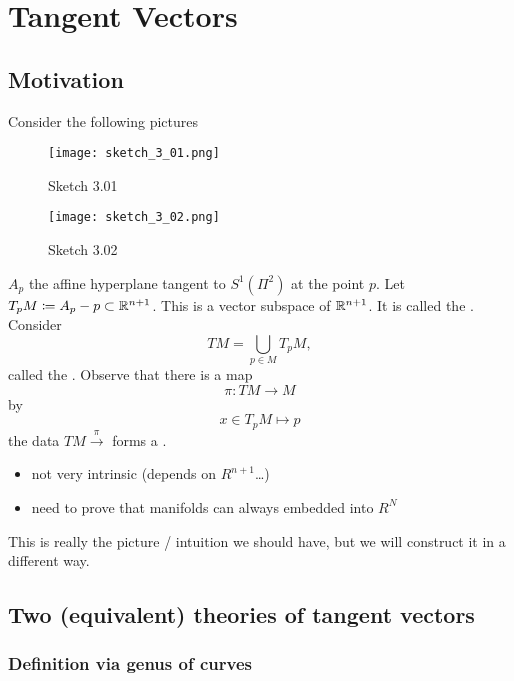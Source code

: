 \chapter{Tangent Vectors}

\section{Motivation}

Consider the following pictures 
\begin{figure}[H]
    \centering
    \texttt{[image: sketch\_3\_01.png]}
    \caption{Sketch 3.01}
\end{figure}
\begin{figure}[H]
    \centering
    \texttt{[image: sketch\_3\_02.png]}
    \caption{Sketch 3.02}
\end{figure}
\(A_p\) the affine hyperplane tangent to \(S^1 (\Pi^2)\) at the point \(p\).
Let \(T_p M\coloneqq A_p-p\subset\mathbb{R}^{n+1}\). This is a vector subspace of \(\mathbb{R}^{n+1}\).
It is called the . Consider \[TM=\bigcup_{p\in M} T_pM,\]
called the . Observe that there is a map 
\[\pi:TM\to M\]
by 
\[x\in T_p M\mapsto p\]
the data \(TM\stackrel{\pi}{\to}\) forms a .


\begin{itemize}
    \item not very intrinsic (depends on \(R^{n+1}\)\dots) 
    \item need to prove that manifolds can always embedded into \(R^N\)
\end{itemize}

This is really the picture / intuition we should have, but we will construct it in a different way.

\section{Two (equivalent) theories of tangent vectors} 

\subsection{Definition via genus of curves}

